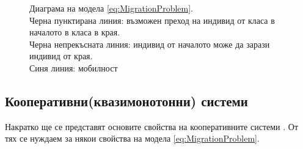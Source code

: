\begin{figure}{}
    \centering
    \caption{Диаграма на модела \eqref{eq:MigrationProblem}.\\
    Черна пунктирана линия: възможен преход на индивид от класа в началото в класа в края.\\
    Черна непрекъсната линия: индивид от началото може да зарази индивид от края.\\
    Синя линия: мобилност}
    \label{fig:TwoPatchModel}
    \end{figure}



\subsection{Кооперативни(квазимонотонни) системи}
Накратко ще се представят основите свойства на кооперативните системи \cite{Capasso2008}. От тях се нуждаем за някои свойства на модела \eqref{eq:MigrationProblem}.


